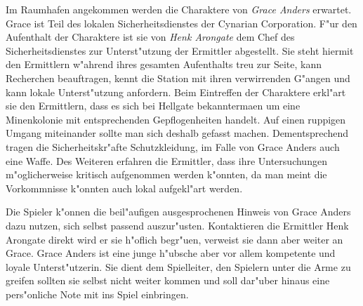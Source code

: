 Im Raumhafen angekommen werden die Charaktere von \emph{Grace Anders} erwartet. Grace ist Teil des lokalen Sicherheitsdienstes der Cynarian Corporation. F"ur den Aufenthalt der Charaktere ist sie von \emph{Henk Arongate} dem Chef des Sicherheitsdienstes zur Unterst"utzung der Ermittler abgestellt. Sie steht hiermit den Ermittlern w"ahrend ihres gesamten Aufenthalts treu zur Seite, kann Recherchen beauftragen, kennt die Station mit ihren verwirrenden G"angen und kann lokale Unterst"utzung anfordern. Beim Eintreffen der Charaktere erkl"art sie den Ermittlern, dass es sich bei Hellgate bekannterma\3en um eine Minenkolonie mit entsprechenden Gepflogenheiten handelt. Auf einen ruppigen Umgang miteinander sollte man sich deshalb gefasst machen. Dementsprechend tragen die Sicherheitskr"afte Schutzkleidung, im Falle von Grace Anders auch eine Waffe. Des Weiteren erfahren die Ermittler, dass ihre Untersuchungen m"oglicherweise kritisch aufgenommen werden k"onnten, da man meint die Vorkommnisse k"onnten auch lokal aufgekl"art werden.

\begin{remarks}
	Die Spieler k"onnen die beil"aufigen ausgesprochenen Hinweis von Grace Anders dazu nutzen, sich selbst passend auszur"usten. Kontaktieren die Ermittler Henk Arongate direkt wird er sie h"oflich begr"u\3en, verweist sie dann aber weiter an Grace. Grace Anders ist eine junge h"ubsche aber vor allem kompetente und loyale Unterst"utzerin. Sie dient dem Spielleiter, den Spielern unter die Arme zu greifen sollten sie selbst nicht weiter kommen und soll dar"uber hinaus eine pers"onliche Note mit ins Spiel einbringen.
\end{remarks}

